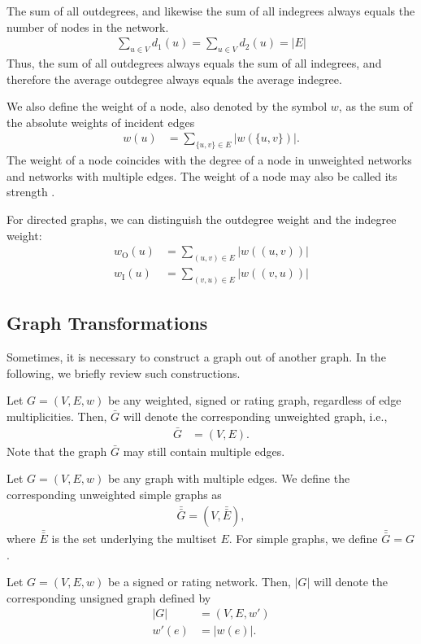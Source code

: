 \documentclass{article}
\begin{document}
The sum of all outdegrees, and likewise the sum of all indegrees always
equals the number of nodes in the network.  
\begin{align}
  \sum_{u\in V} d_1(u) = \sum_{u \in V} d_2(u) = |E|
\end{align}
Thus, the sum of all outdegrees always equals the sum of all indegrees,
and therefore the average outdegree always equals the average indegree.  

We also define the weight of a node, also denoted by the symbol $w$, as
the sum of the absolute weights of incident edges
\begin{align}
  w(u) &= \sum_{ \{u,v\} \in E} |w(\{u,v\})|. 
\end{align}
The weight of a node coincides with the degree of a node in unweighted
networks and networks with multiple edges. 
The weight of a node may also be called its strength \citep{b792}. 

For directed graphs, we can distinguish the outdegree weight and the
indegree weight:
\begin{align}
  w_{\mathrm O}(u) &= \sum_{(u,v)\in E} |w((u,v))| \\
  w_{\mathrm I}(u) &= \sum_{(v,u)\in E} |w((v,u))| 
\end{align}

\subsection{Graph Transformations}
Sometimes, it is necessary to construct a graph out of another graph.
In the following, we briefly review such constructions.  

Let $G=(V,E,w)$ be any weighted, signed or rating graph, regardless of
edge multiplicities.  Then, $\bar G$ will denote the corresponding
unweighted graph, i.e.,
\begin{align}
  \bar G &= (V,E).
\end{align}
Note that the graph $\bar G$ may still contain multiple edges. 

Let $G=(V,E,w)$ be any graph with multiple edges.  We define the
corresponding unweighted simple graphs as
\begin{align}
  \bar{\bar{G}} = (V, \bar{\bar E}),
\end{align}
where $\bar{\bar E}$ is the set underlying the multiset $E$. For simple
graphs, we define $\bar{\bar G} = G$. 

Let $G=(V,E,w)$ be a signed or rating network.  Then, $|G|$ will denote
the corresponding unsigned graph defined by
\begin{align}
  |G| &= (V,E, w') \\
  w'(e) &= |w(e)|. \nonumber
\end{align}
\end{document}
